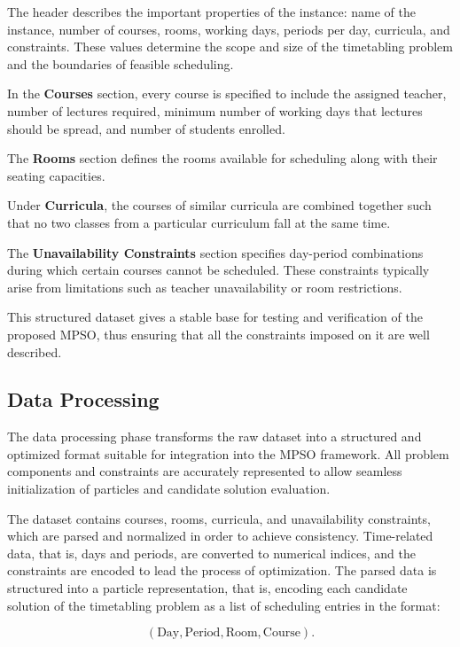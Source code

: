 \clearpage

The header describes the important properties of the instance: name of the instance, number of courses, rooms, working days, periods per day, curricula, and constraints. These values determine the scope and size of the timetabling problem and the boundaries of feasible scheduling.

In the \textbf{Courses} section, every course is specified to include the assigned teacher, number of lectures required, minimum number of working days that lectures should be spread, and number of students enrolled. 

The \textbf{Rooms} section defines the rooms available for scheduling along with their seating capacities. 

Under \textbf{Curricula}, the courses of similar curricula are combined together such that no two classes from a particular curriculum fall at the same time. 


The \textbf{Unavailability Constraints} section specifies day-period combinations during which certain courses cannot be scheduled. These constraints typically arise from limitations such as teacher unavailability or room restrictions. 

This structured dataset gives a stable base for testing and verification of the proposed MPSO, thus ensuring that all the constraints imposed on it are well described.

\subsection{Data Processing}
\label{subsec:data_processing}

The data processing phase transforms the raw dataset into a structured and optimized format suitable for integration into the MPSO framework. All problem components and constraints are accurately represented to allow seamless initialization of particles and candidate solution evaluation.

The dataset contains courses, rooms, curricula, and unavailability constraints, which are parsed and normalized in order to achieve consistency. Time-related data, that is, days and periods, are converted to numerical indices, and the constraints are encoded to lead the process of optimization. The parsed data is structured into a particle representation, that is, encoding each candidate solution of the timetabling problem as a list of scheduling entries in the format:

\[
(\text{Day}, \text{Period}, \text{Room}, \text{Course}).
\]

